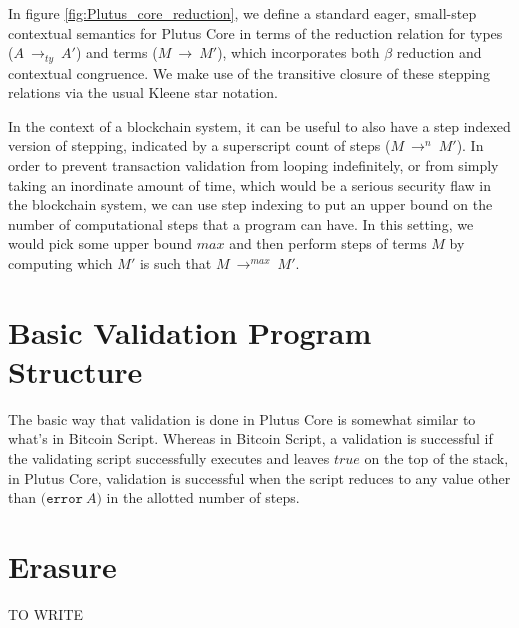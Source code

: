 \documentclass[conference]{IEEEtran}
\newcommand{\keyword}[1]{\texttt{#1}}
\newcommand{\construct}[1]{\texttt{(} #1 \texttt{)}}
\newcommand{\error}[1]{\construct{\keyword{error} ~ #1}}
\newcommand{\typeStep}[2]{#1 ~ \rightarrow_{ty} ~ #2}
\newcommand{\step}[2]{#1 ~ \rightarrow ~ #2}
\newcommand{\multistepIndexed}[3]{#1 ~ \rightarrow^{#2} ~ #3}
\begin{document}
In figure \ref{fig:Plutus_core_reduction}, we define a standard eager, small-step contextual semantics for Plutus Core in terms of the reduction relation for types (\(\typeStep{A}{A'}\)) and terms (\(\step{M}{M'}\)), which incorporates both $\beta$ reduction and contextual congruence. We make use of the transitive closure of these stepping relations via the usual Kleene star notation.

In the context of a blockchain system, it can be useful to also have a step indexed version of stepping, indicated by a superscript count of steps (\(\multistepIndexed{M}{n}{M'}\)). In order to prevent transaction validation from looping indefinitely, or from simply taking an inordinate amount of time, which would be a serious security flaw in the blockchain system, we can use step indexing to put an upper bound on the number of computational steps that a program can have. In this setting, we would pick some upper bound $\mathit{max}$ and then perform steps of terms $M$ by computing which $M'$ is such that \(\multistepIndexed{M}{\mathit{max}}{M'}\).











\section{Basic Validation Program Structure}

The basic way that validation is done in Plutus Core is somewhat similar to what's in Bitcoin Script. Whereas in Bitcoin Script, a validation is successful if the validating script successfully executes and leaves $\textit{true}$ on the top of the stack, in Plutus Core, validation is successful when the script reduces to any value other than \(\error{A}\) in the allotted number of steps.







\section{Erasure}

TO WRITE




\end{document}
